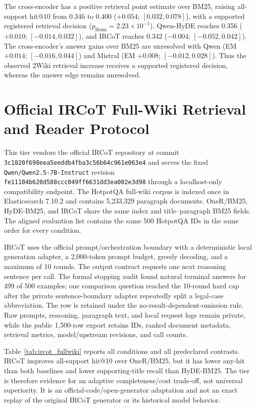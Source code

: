 \documentclass[pdflatex,sn-basic,Numbered]{sn-jnl}
\begin{document}
The cross-encoder has a positive retrieval point estimate over BM25, raising all-support hit@10 from 0.346 to 0.400 ($+0.054$; $[0.032,0.078]$), with a supported registered retrieval decision ($p_{\mathrm{Holm}}=2.23\times10^{-5}$). Qwen-HyDE reaches 0.356 ($+0.010$; $[-0.014,0.032]$), and IRCoT reaches 0.342 ($-0.004$; $[-0.052,0.042]$). The cross-encoder's answer gains over BM25 are unresolved with Qwen (EM $+0.014$; $[-0.016,0.044]$) and Mistral (EM $+0.008$; $[-0.012,0.028]$). Thus the observed 2Wiki retrieval increase receives a supported registered decision, whereas the answer edge remains unresolved.



\FloatBarrier

\section{Official IRCoT Full-Wiki Retrieval and Reader Protocol}
\label{sec:ircot_fullwiki}

This tier vendors the official IRCoT repository at commit \texttt{3c1820f698eea5eeddb4fba3c56b64c961e063e4} and serves the fixed \texttt{Qwen/Qwen2.5-7B-Instruct} revision \texttt{fe11104b620d588ccc049ff6631dd3ea002e3d98} through a localhost-only compatibility endpoint. The HotpotQA full-wiki corpus is indexed once in Elasticsearch 7.10.2 and contains 5,233,329 paragraph documents. OneR/BM25, HyDE-BM25, and IRCoT share the same index and title--paragraph BM25 fields. The aligned evaluation list contains the same 500 HotpotQA IDs in the same order for every condition.

IRCoT uses the official prompt/orchestration boundary with a deterministic local generation adapter, a 2,000-token prompt budget, greedy decoding, and a maximum of 10 rounds. The output contract requests one next reasoning sentence per call. The formal stopping audit found natural terminal answers for 499 of 500 examples; one comparison question reached the 10-round hard cap after the private sentence-boundary adapter repeatedly split a legal-case abbreviation. The row is retained under the no-result-dependent-omission rule. Raw prompts, reasoning, paragraph text, and local request logs remain private, while the public 1,500-row export retains IDs, ranked document metadata, retrieval metrics, model/upstream revisions, and call counts.



Table~\ref{tab:ircot_fullwiki} reports all conditions and all predeclared contrasts. IRCoT improves all-support hit@10 over OneR/BM25, but it has lower any-hit than both baselines and lower supporting-title recall than HyDE-BM25. The tier is therefore evidence for an adaptive completeness/cost trade-off, not universal superiority. It is an official-code/open-generator adaptation and not an exact replay of the original IRCoT generator or its historical model behavior.
\end{document}
